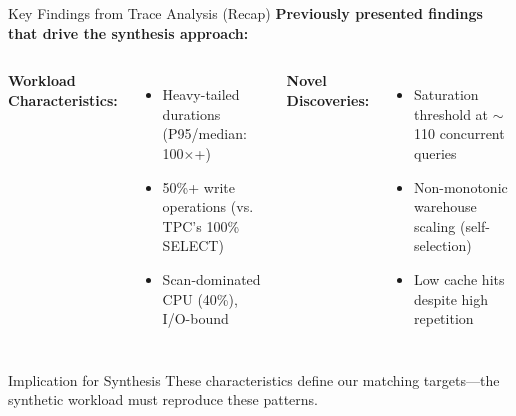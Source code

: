 \documentclass[aspectratio=169]{beamer}
\begin{document}
\begin{frame}{Key Findings from Trace Analysis (Recap)}
    \textbf{Previously presented findings that drive the synthesis approach:}
    
    \vspace{0.3cm}
    \begin{columns}
        \textbf{Workload Characteristics:}
        \begin{itemize}
            \item Heavy-tailed durations (P95/median: 100$\times$+)
            \item 50\%+ write operations (vs. TPC's 100\% SELECT)
            \item Scan-dominated CPU (40\%), I/O-bound
        \end{itemize}
        
        \textbf{Novel Discoveries:}
        \begin{itemize}
            \item Saturation threshold at $\sim$110 concurrent queries
            \item Non-monotonic warehouse scaling (self-selection)
            \item Low cache hits despite high repetition
        \end{itemize}
    \end{columns}
    
    \vspace{0.4cm}
    \begin{block}{Implication for Synthesis}
        These characteristics define our matching targets---the synthetic workload must reproduce these patterns.
    \end{block}
\end{frame}
\end{document}
